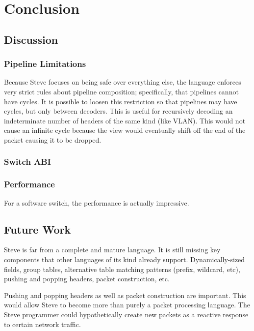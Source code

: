 \chapter{ Conclusion} \label{ch:conclusion}

\section{Discussion}

\subsection{Pipeline Limitations}

Because Steve focuses on being safe over everything else, the language enforces very strict rules about pipeline composition; specifically, that pipelines cannot have cycles. It is possible to loosen this restriction so that pipelines may have cycles, but only between decoders. This is useful for recursively decoding an indeterminate number of headers of the same kind (like VLAN). This would not cause an infinite cycle because the view would eventually shift off the end of the packet causing it to be dropped.

\subsection{Switch ABI}



\subsection{Performance}

For a software switch, the performance is actually impressive. 

\section{Future Work}

Steve is far from a complete and mature language. It is still missing key components that other languages of its kind already support. Dynamically-sized fields, group tables, alternative table matching patterns (prefix, wildcard, etc), pushing and popping headers, packet construction, etc.

Pushing and popping headers as well as packet construction are important. This would allow Steve to become more than purely a packet processing language. The Steve programmer could hypothetically create new packets as a reactive response to certain network traffic.

